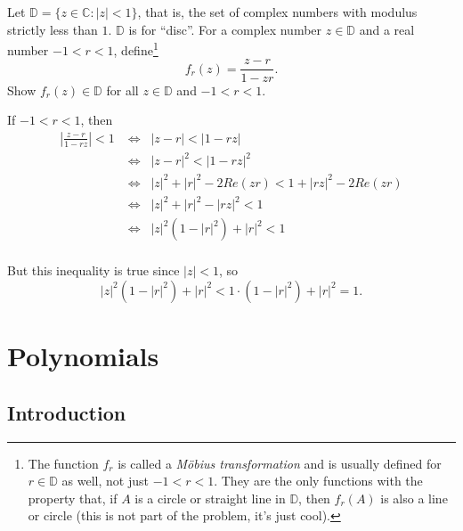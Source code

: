 \documentclass[11pt,dvipsnames]{book}
\numberwithin{figure}{section} %
\numberwithin{table}{section} %
\begin{document}
\begin{exercise} Let $\mathbb{D}=\{z\in \mathbb{C}: |z|<1\}$, that is, the set of complex numbers with modulus strictly less than $1$. \(\mathbb{D}\) is for ``disc''. For a complex number $z\in \mathbb{D}$ and a real number $-1< r<1$, define\footnote{The function $f_{r}$ is called a {\it M\"obius transformation} and is usually defined for $r\in \mathbb{D}$ as well, not just $-1<r<1$. They are the only functions with the property that, if $A$ is a circle or straight line in $\mathbb{D}$, then $f_{r}(A)$ is also a line or circle (this is not part of the problem, it's just cool).}
\[
f_{r}(z) = \frac{z-r}{1-zr}.\]
 Show $f_{r}(z)\in \mathbb{D}$ for all $z\in \mathbb{D}$ and $-1<r<1$.

\begin{solution}
If $-1<r<1$, then
\begin{align*}
\left|\frac{z-r}{1-rz}\right|<1
& \Leftrightarrow \;\;|z-r|<|1-rz|\\
&  \Leftrightarrow \;\; |z-r|^{2}<|1-rz|^{2}\\
& \Leftrightarrow \;\; |z|^{2}+|r|^{2}-2Re(zr)<1+|rz|^{2}-2Re(zr)\\
& \Leftrightarrow \;\; |z|^{2}+|r|^{2}-|rz|^{2}<1\\
& \Leftrightarrow \;\; |z|^{2}(1-|r|^{2})+|r|^{2}<1\\
\end{align*}

But this inequality is true since $|z|<1$, so
\[
|z|^{2}(1-|r|^{2})+|r|^{2}<1\cdot (1-|r|^{2})+|r|^{2}=1.
\]

\end{solution}

\end{exercise}

\chapter{Polynomials}
%
%
%
%

\section{Introduction}
\end{document}
